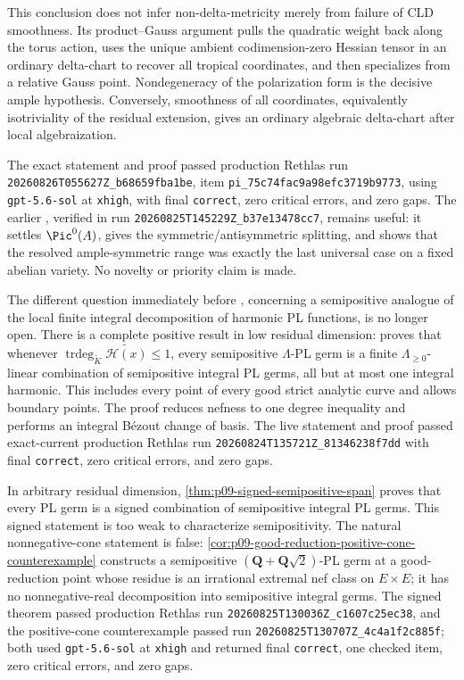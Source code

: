This conclusion does not infer non-delta-metricity merely from failure of
CLD smoothness.  Its product--Gauss argument pulls the quadratic weight back
along the torus action, uses the unique ambient codimension-zero Hessian
tensor in an ordinary delta-chart to recover all tropical coordinates, and
then specializes from a relative Gauss point.  Nondegeneracy of the
polarization form is the decisive ample hypothesis.  Conversely, smoothness
of all coordinates, equivalently isotriviality of the residual extension,
gives an ordinary algebraic delta-chart after local algebraization.

The exact statement and proof passed production Rethlas run
\nolinkurl{20260826T055627Z_b68659fba1be}, item
\nolinkurl{pi_75c74fac9a98efc3719b9773}, using
\texttt{gpt-5.6-sol} at \texttt{xhigh}, with final
\texttt{correct}, zero critical errors, and zero gaps.  The earlier
, verified in run
\nolinkurl{20260825T145229Z_b37e13478cc7}, remains useful: it settles
\(\Pic^0(A)\), gives the symmetric/antisymmetric splitting, and shows that
the resolved ample-symmetric range was exactly the last universal case on a
fixed abelian variety.  No novelty or priority claim is made.

The different question immediately before
\cite[Proposition~7.5]{GJR26}, concerning a semipositive analogue of the
local finite integral decomposition of harmonic PL functions, is no longer
open.  There is a complete positive result in low residual dimension:
 proves that whenever
\(\operatorname{trdeg}_{\widetilde K}
\widetilde{\mathscr H(x)}\leq1\), every semipositive
\(\Lambda\)-PL germ is a finite \(\Lambda_{\geq0}\)-linear combination of
semipositive integral PL germs, all but at most one integral harmonic.  This
includes every point of every good strict analytic curve and allows boundary
points.  The proof reduces nefness to one degree inequality and performs an
integral B\'ezout change of basis.
The live statement and proof passed exact-current production Rethlas run
\nolinkurl{20260824T135721Z_81346238f7dd} with final \texttt{correct}, zero
critical errors, and zero gaps.

In arbitrary residual dimension,
\cref{thm:p09-signed-semipositive-span} proves that every PL germ is a
signed combination of semipositive integral PL germs.  This signed statement
is too weak to characterize semipositivity.  The natural nonnegative-cone
statement is false:
\cref{cor:p09-good-reduction-positive-cone-counterexample} constructs a
semipositive \((\mathbf Q+\mathbf Q\sqrt2)\)-PL germ at a good-reduction
point whose residue is an irrational extremal nef class on \(E\times E\);
it has no nonnegative-real decomposition into semipositive integral germs.
The signed theorem passed production Rethlas run
\nolinkurl{20260825T130036Z_c1607c25ec38}, and the positive-cone
counterexample passed run
\nolinkurl{20260825T130707Z_4c4a1f2c885f}; both used
\texttt{gpt-5.6-sol} at \texttt{xhigh} and returned final
\texttt{correct}, one checked item, zero critical errors, and zero gaps.

